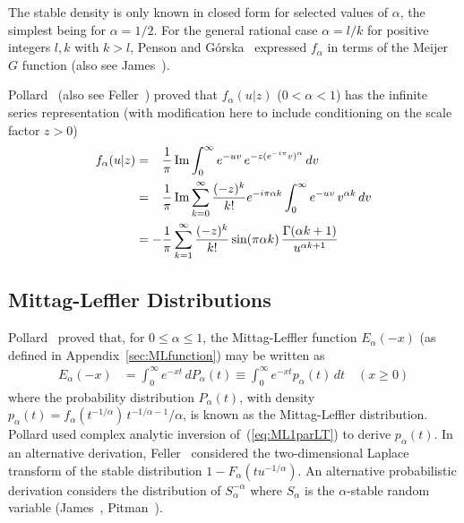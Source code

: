 \documentclass[a4paper,12pt]{article}
\begin{document}
{{The stable density is only known in closed form for selected values of $\alpha$, the simplest  being for $\alpha=1/2$.
For the  general  rational  case $\alpha=l/k$ for positive integers $l,k$ with $k>l$, Penson and G\'{o}rska~\cite{PensonGorska} expressed
 $f_\alpha$ in terms of the Meijer $G$ function
 (also see James~\cite[8]{James_Lamperti}).

 Pollard~\cite{Pollard} (also see Feller~\cite[XVII.6]{Feller2}) proved that $f_\alpha(u \vert z)$ ($0<\alpha<1$)
has the   infinite series representation
 (with  modification here to include conditioning on the scale factor $z>0$)
\begin{align}
  f_\alpha(u\vert z)  &= \phantom{-} \frac{1}{\pi}\,{\rm Im}  \int_0^\infty e^{-uv} \, e^{-z (e^{-i\pi}v)^\alpha}  \, dv  
\label{eq:Pollard} \\
&= \phantom{-} \frac{1}{\pi}\,{\rm Im}
   \sum_{k=0}^\infty \frac{(-z)^k}{k!} e^{-i\pi\alpha k}  \int_0^\infty e^{-uv} \, v^{\alpha k} \, dv
\label{eq:Pollardinfsum1} \\
&= -\frac{1}{\pi}
   \sum_{k=1}^\infty \frac{(-z)^k}{k!} \sin(\pi\alpha k) \, \frac{\Gamma(\alpha k+1)}{u^{\alpha k+1}}
\label{eq:Pollardinfsum2} 
\end{align}
 
 \subsection{Mittag-Leffler Distributions}
\label{sec:ML}
 
 Pollard~\cite{PollardML}  proved that, for $0\le\alpha\le1$, the  Mittag-Leffler function $E_\alpha(-x)$ 
 (as defined in Appendix~\ref{sec:MLfunction})
may be written as
\begin{align}
E_\alpha(-x) &= \int_0^\infty e^{-x t} \, dP_\alpha(t) \equiv \int_0^\infty e^{-x t} p_\alpha(t) \, dt \quad (x\ge0)
\label{eq:ML1parLT}
\end{align}
where the probability  distribution $P_\alpha(t)$, with  density $p_\alpha(t) = f_\alpha(t^{-1/\alpha}) \, t^{-1/\alpha-1}/\alpha$,
is known as the  Mittag-Leffler   distribution.
Pollard used  complex analytic inversion of~(\ref{eq:ML1parLT})  to derive $p_\alpha(t)$.
In an alternative derivation, Feller~\cite[XIII.8]{Feller2} considered the two-dimensional Laplace  transform of the 
stable distribution   $1-F_\alpha(t u^{-1/\alpha})$. %
An alternative probabilistic derivation considers the distribution of   $S^{-\alpha}_{\alpha}$ where $S_{\alpha}$
is the $\alpha$-stable random variable (James~\cite{James_Lamperti}, Pitman~\cite{Pitman_CSP}).

}}
\end{document}
